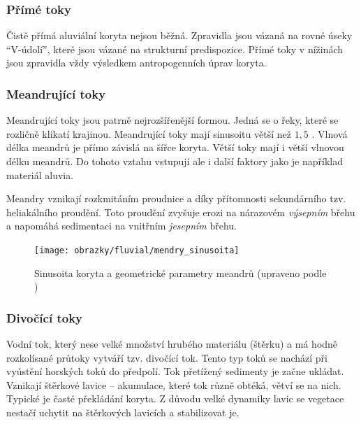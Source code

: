 \subsubsection{Přímé toky}
Čistě přímá aluviální koryta nejsou běžná. Zpravidla jsou vázaná na rovné úseky \enquote{V-údolí}, které jsou vázané na strukturní predispozice. Přímé toky v nížinách jsou zpravidla vždy výsledkem antropogenních úprav koryta. 

\subsubsection{Meandrující toky}
Meandrující toky jsou patrně nejrozšířenější formou. Jedná se o řeky, které se rozličně klikatí krajinou. Meandrující toky mají sinusoitu větší než $1,5$ \parencite{huggettFundamentalsGeomorphology2017}. Vlnová délka meandrů je přímo závislá na šířce koryta. Větší toky mají i větší vlnovou délku meandrů. Do tohoto vztahu vstupují ale i další faktory jako je například materiál aluvia. 

Meandry vznikají rozkmitáním proudnice a díky přítomnosti sekundárního tzv. heliakálního proudění. Toto proudění zvyšuje erozi na nárazovém \emph{výsepním} břehu a napomáhá sedimentaci na vnitřním \emph{jesepním} břehu. 

\begin{figure}
	\centering
	\texttt{[image: obrazky/fluvial/mendry\_sinusoita]}
	\caption{Sinusoita koryta a geometrické parametry meandrů (upraveno podle \textcite{biermanKeyConceptsGeomorphology2014})}
	\label{fig:mendrysinusoita}
\end{figure}

\subsubsection{Divočící toky}
Vodní tok, který nese velké množství hrubého materiálu (štěrku) a má hodně rozkolísané průtoky vytváří tzv. divočící tok. Tento typ toků se nachází při vyústění horských toků do předpolí. Tok přetížený sedimenty je začne ukládat. Vznikají štěrkové lavice -- akumulace, které tok různě obtéká, větví se na nich. Typické je časté překládání koryta. Z důvodu velké dynamiky lavic se vegetace nestačí uchytit na štěrkových lavicích a stabilizovat je.

